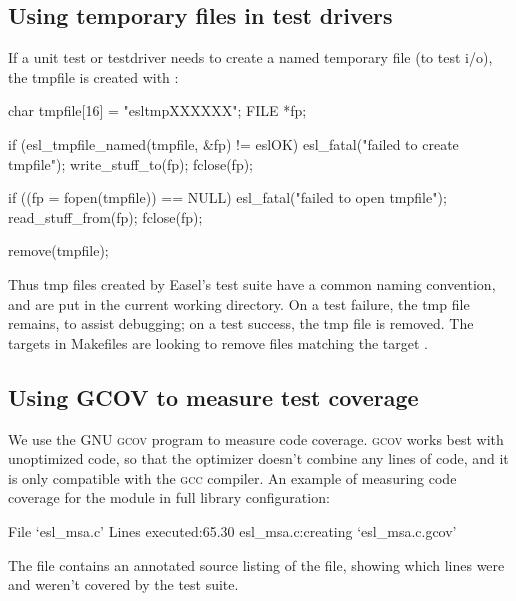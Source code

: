\subsection{Using temporary files in test drivers}

If a unit test or testdriver needs to create a named temporary file
(to test i/o), the tmpfile is created with
:

\begin{cchunk}
   char  tmpfile[16] = "esltmpXXXXXX";
   FILE *fp;

   if (esl_tmpfile_named(tmpfile, &fp) != eslOK) esl_fatal("failed to create tmpfile");
   write_stuff_to(fp);
   fclose(fp);

   if ((fp = fopen(tmpfile)) == NULL) esl_fatal("failed to open tmpfile");
   read_stuff_from(fp);
   fclose(fp);

   remove(tmpfile);
\end{cchunk}

Thus tmp files created by Easel's test suite have a common naming
convention, and are put in the current working directory. On a test
failure, the tmp file remains, to assist debugging; on a test success,
the tmp file is removed. The  targets in Makefiles
are looking to remove files matching the target .

\subsection{Using GCOV to measure test coverage} 

We use the GNU \textsc{gcov} program to measure code
coverage. \textsc{gcov} works best with unoptimized code, so that the
optimizer doesn't combine any lines of code, and it is only compatible
with the \textsc{gcc} compiler. An example of measuring code coverage
for the  module in full library configuration:

\begin{cchunk}
  File `esl_msa.c'
  Lines executed:65.30%
  esl_msa.c:creating `esl_msa.c.gcov'
\end{cchunk}

The file  contains an annotated source listing
of the  file, showing which lines were and weren't covered
by the test suite.

